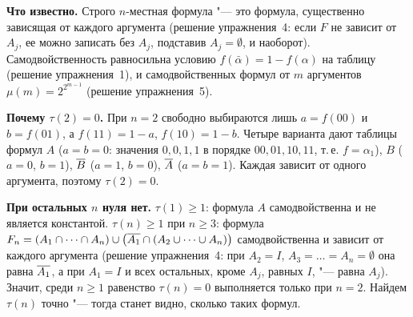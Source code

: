 \begin{solution}[6 (\S\,3)]
\textbf{Что известно.} Строго $n$-местная формула "--- это формула,
существенно зависящая от каждого аргумента (решение упражнения~4:
если $F$ не зависит от $A_j$, ее можно записать без $A_j$, подставив
$A_j=\emptyset$, и наоборот). Самодвойственность равносильна условию
$f(\bar\alpha)=1-f(\alpha)$ на таблицу (решение упражнения~1), и
самодвойственных формул от $m$ аргументов $\mu(m)=2^{2^{m-1}}$ (решение
упражнения~5).

\textbf{Почему $\tau(2)=0$.} При $n=2$ свободно выбираются лишь
$a=f(00)$ и $b=f(01)$, а $f(11)=1-a$, $f(10)=1-b$. Четыре варианта дают
таблицы формул $A$ ($a=b=0$: значения $0,0,1,1$ в порядке $00,01,10,11$,
т.\,е. $f=\alpha_1$), $B$ ($a=0$, $b=1$), $\overline{B}$ ($a=1$, $b=0$), $\overline{A}$
($a=b=1$). Каждая зависит от одного аргумента, поэтому $\tau(2)=0$.

\textbf{При остальных $n$ нуля нет.} $\tau(1)\ge1$: формула $A$
самодвойственна и не является константой. $\tau(n)\ge1$ при $n\ge3$: формула
$F_n=(A_1\cap\dots\cap A_n)\cup\bigl(\overline{A_1}\cap(A_2\cup\dots\cup A_n)\bigr)$
самодвойственна и зависит от каждого аргумента (решение упражнения~4:
при $A_2=I$, $A_3=\dots=A_n=\emptyset$ она равна $\overline{A_1}$, а при
$A_1=I$ и всех остальных, кроме $A_j$, равных $I$, "--- равна $A_j$).
Значит, среди $n\ge1$ равенство $\tau(n)=0$ выполняется только при $n=2$.
Найдем $\tau(n)$ точно "--- тогда станет видно, сколько таких формул.


\end{solution}
